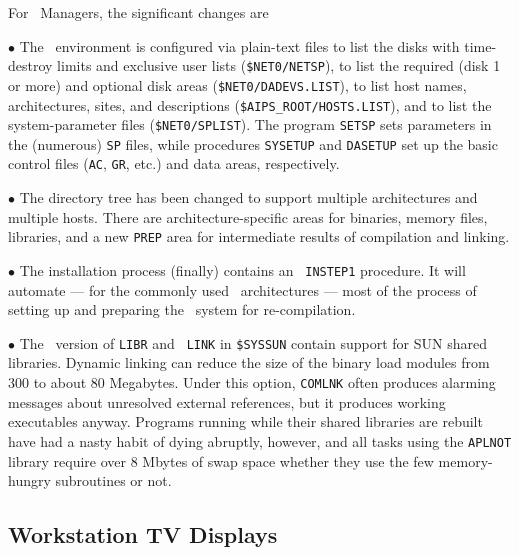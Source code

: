 For \AIPS\ Managers, the significant changes are
\begin{description}
\item{$\bullet$} The \AIPS\ environment is configured via plain-text
files to list the disks with time-destroy limits and exclusive user
lists ({\tt \$NET0/NETSP}), to list the required (disk 1 or more) and
optional disk areas ({\tt \$NET0/DADEVS.LIST}), to list host names,
architectures, sites, and descriptions ({\tt \$AIPS\_ROOT/HOSTS.LIST}),
and to list the system-parameter files \hbox{({\tt \$NET0/SPLIST})}.
The program {\tt SETSP} sets parameters in the (numerous) {\tt SP}
files, while procedures {\tt SYSETUP} and {\tt DASETUP} set up the
basic control files ({\tt AC}, {\tt GR}, etc.) and data areas,
respectively.

\item{$\bullet$} The directory tree has been changed to support
multiple architectures and multiple hosts.  There are
architecture-specific areas for binaries, memory files, libraries, and
a new {\tt PREP} area for intermediate results of compilation and
linking.

\item{$\bullet$} The installation process (finally) contains an {\tt
INSTEP1} procedure.  It will automate --- for the commonly used \AIPS\
architectures --- most of the process of setting up and preparing the
\AIPS\ system for re-compilation.

\item{$\bullet$} The \RELEASENAME\ version of {\tt LIBR} and {\tt
LINK} in {\tt \$SYSSUN} contain support for SUN shared libraries.
Dynamic linking can reduce the size of the binary load modules from
300 to about 80 Megabytes.  Under this option, {\tt COMLNK} often
produces alarming messages about unresolved external references, but
it produces working executables anyway.  Programs running while their
shared libraries are rebuilt have had a nasty habit of dying abruptly,
however, and all tasks using the {\tt APLNOT} library require over 8
Mbytes of swap space whether they use the few memory-hungry
subroutines or not.

\end{description}

\subsection{Workstation TV Displays}

